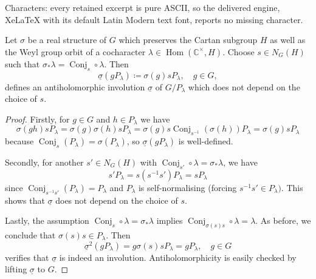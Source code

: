 \documentclass[10pt,a4paper]{amsart}
\newcommand{\Conj}{\operatorname{Conj}}
\newcommand{\C}{\mathbb{C}}
\newcommand{\Hom}{\operatorname{Hom}}
\newcommand{\inv}{^{-1}}
\begin{document}
Characters: every retained excerpt is pure ASCII, so the delivered engine, XeLaTeX with its default Latin Modern text font, reports no missing character.
\begin{prop}
\label{prop:underline_sigma}
    Let $\sigma$ be a real structure of $G$ which preserves the Cartan subgroup $H$ as well as the Weyl group orbit of a cocharacter $\lambda\in \Hom(\C^\times, H)$. Choose $s\in N_G(H)$ such that $\sigma_*\lambda = \Conj_s\circ \lambda$. Then
    $$
        \underline{\sigma}(gP_\lambda)
        \coloneqq
        \sigma(g)sP_\lambda,
        \quad
        g\in G,
    $$
    defines an antiholomorphic involution $\underline{\sigma}$ of $G/P_\lambda$ which does not depend on the choice of $s$.
\end{prop}

\begin{proof}
    Firstly, for $g\in G$ and $h\in P_\lambda$ we have
    $$
        \sigma(gh)sP_\lambda
        =
        \sigma(g)\sigma(h)sP_\lambda
        =
        \sigma(g)s \Conj_{s\inv}(\sigma(h)) P_\lambda
        =
        \sigma(g)s P_\lambda
    $$
    because $\Conj_s(P_\lambda) = \sigma(P_\lambda)$, so $\underline{\sigma}(gP_\lambda)$ is well-defined. 
    
    Secondly, for another $s'\in N_G(H)$ with $\Conj_{s'}\circ \lambda = \sigma_*\lambda$, we have
    $$
        s'P_\lambda
        =
        s(s\inv s')P_\lambda
        =
        sP_\lambda
    $$
    since $\Conj_{s\inv s'}(P_\lambda) = P_\lambda$ and $P_\lambda$ is self-normalising (forcing $s\inv s'\in P_\lambda)$. This shows that $\underline{\sigma}$ does not depend on the choice of $s$.

    Lastly, the assumption $\Conj_s \circ \lambda = \sigma_*\lambda$ implies $\Conj_{\sigma(s)s}\circ \lambda = \lambda$. As before, we conclude that $\sigma(s)s\in P_\lambda$. Then
    $$
        \underline{\sigma}^2(gP_\lambda)
        =
        g\sigma(s)sP_\lambda
        =
        gP_\lambda,
        \quad
        g\in G
    $$
    verifies that $\underline{\sigma}$ is indeed an involution. Antiholomorphicity is easily checked by lifting $\underline{\sigma}$ to $G$.
\end{proof}
\end{document}
